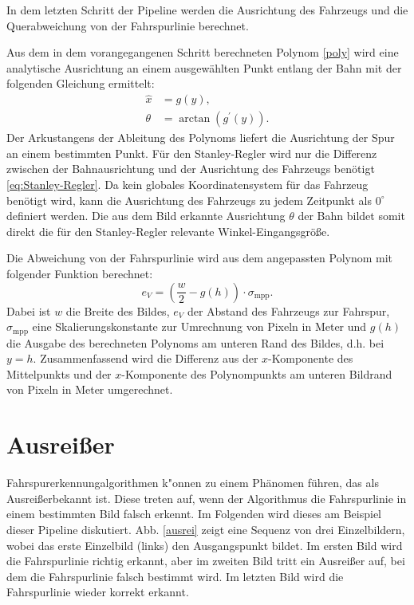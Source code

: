 \documentclass[arbeit=studie,oneside,BCOR=12mm]{ArbeitRST}
\begin{document}
In dem letzten Schritt der Pipeline werden die Ausrichtung des Fahrzeugs und die Querabweichung von
der Fahrspurlinie berechnet. 

Aus dem in dem vorangegangenen Schritt berechneten Polynom \eqref{poly} wird eine
analytische Ausrichtung an einem ausgewählten Punkt entlang der Bahn mit der
folgenden Gleichung \cite{tangentangle} ermittelt:
\begin{subequations} 
    \begin{align}
        \hat{x} &= g(y), \\
        \theta &= \arctan(g^\prime(y)).
    \end{align}
\end{subequations} 
Der Arkustangens der Ableitung des Polynoms liefert die Ausrichtung der Spur
an einem bestimmten Punkt. Für den Stanley-Regler wird nur die Differenz
zwischen der Bahnausrichtung und der Ausrichtung des Fahrzeugs benötigt \eqref{eq:Stanley-Regler}. Da
kein globales Koordinatensystem für das Fahrzeug benötigt wird, kann die
Ausrichtung des Fahrzeugs zu jedem Zeitpunkt als $0^{\circ}$ definiert
werden. Die aus dem Bild erkannte Ausrichtung $\theta$ der Bahn bildet somit
direkt die für den Stanley-Regler relevante Winkel-Eingangsgröße.

Die Abweichung von der Fahrspurlinie wird aus dem angepassten Polynom mit
folgender Funktion berechnet: 
\begin{equation}
    e_{V} = \left(\frac{w}{2} - g(h)\right)\cdot \sigma_\mathrm{mpp}.
\end{equation}
Dabei ist $w$ die Breite des Bildes, $e_{V}$ der Abstand des Fahrzeugs zur
Fahrspur, $\sigma_\mathrm{mpp}$ eine Skalierungskonstante zur Umrechnung von
Pixeln in Meter und $g(h)$ die Ausgabe des berechneten Polynoms am unteren Rand
des Bildes, d.h. bei $y=h$. Zusammenfassend wird die Differenz aus der
$x$-Komponente des Mittelpunkts und der $x$-Komponente des Polynompunkts am
unteren Bildrand von Pixeln in Meter umgerechnet.

\section{Ausrei{\ss}er}

Fahrspurerkennungalgorithmen k"onnen zu einem Phänomen führen, das als \glqq
Ausreißer\grqq bekannt ist. Diese treten auf, wenn der Algorithmus die
Fahrspurlinie in einem bestimmten Bild falsch erkennt. Im Folgenden wird dieses 
am Beispiel dieser Pipeline diskutiert. Abb. \ref{ausrei} zeigt
eine Sequenz von drei Einzelbildern, wobei das erste Einzelbild (links) den
Ausgangspunkt bildet. Im ersten Bild wird die Fahrspurlinie richtig erkannt,
aber im zweiten Bild tritt ein Ausreißer auf, bei dem die Fahrspurlinie falsch
bestimmt wird. Im letzten Bild wird die Fahrspurlinie wieder korrekt erkannt.
\end{document}

